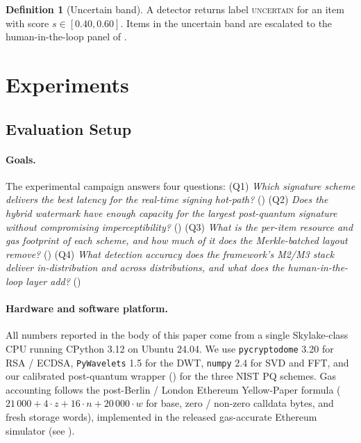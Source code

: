 \documentclass[11pt,a4paper]{article}
\theoremstyle{definition}
\newtheorem{definition}{Definition}
\theoremstyle{plain}
\theoremstyle{remark}
\begin{document}
\begin{definition}[Uncertain band]
A detector returns label \textsc{uncertain} for an item with score
$s\in[0.40,0.60]$. Items in the uncertain band are escalated to the
human-in-the-loop panel of .
\end{definition}

\section{Experiments}\label{sec:experiments}

\subsection{Evaluation Setup}\label{sec:setup}

\paragraph{Goals.}
The experimental campaign answers four questions:
(Q1) \emph{Which signature scheme delivers the best latency for the
real-time signing hot-path?} ()
(Q2) \emph{Does the hybrid watermark have enough capacity for the
largest post-quantum signature without compromising
imperceptibility?} ()
(Q3) \emph{What is the per-item resource and gas footprint of each
scheme, and how much of it does the Merkle-batched layout
remove?} ()
(Q4) \emph{What detection accuracy does the framework's M2/M3 stack
deliver in-distribution and across distributions, and what does the
human-in-the-loop layer add?} ()

\paragraph{Hardware and software platform.}
All numbers reported in the body of this paper come from a single
Skylake-class CPU running CPython 3.12 on Ubuntu 24.04. We use
\texttt{pycryptodome} 3.20 for RSA / ECDSA, \texttt{PyWavelets} 1.5
for the DWT, \texttt{numpy} 2.4 for SVD and FFT, and our calibrated
post-quantum wrapper () for the three NIST PQ
schemes. Gas accounting follows the post-Berlin / London Ethereum
Yellow-Paper formula
($21\,000 + 4 \cdot z + 16 \cdot n + 20\,000 \cdot w$
for base, zero / non-zero calldata bytes, and fresh storage words),
implemented in the released gas-accurate Ethereum simulator (see
).
\end{document}
